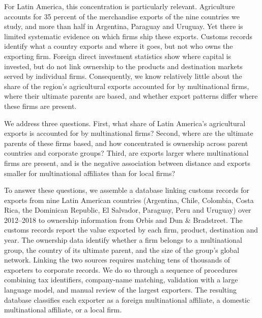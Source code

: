 \documentclass[11pt,a4paper]{article}
\begin{document}
For Latin America, this concentration is particularly relevant. Agriculture accounts for 35 percent
of the merchandise exports of the nine countries we study, and more than half in Argentina, Paraguay
and Uruguay. Yet there is limited systematic evidence on which firms ship these exports. Customs
records identify what a country exports and where it goes, but not who owns the exporting firm.
Foreign direct investment statistics show where capital is invested, but do not link ownership to
the products and destination markets served by individual firms. Consequently, we know relatively
little about the share of the region's agricultural exports accounted for by multinational firms,
where their ultimate parents are based, and whether export patterns differ where these firms are
present.

We address three questions. First, what share of Latin America's agricultural exports is
accounted for by multinational firms? Second, where are the ultimate parents of these firms based,
and how concentrated is ownership across parent countries and corporate groups? Third, are exports
larger where multinational firms are present, and is the negative association between distance and
exports smaller for multinational affiliates than for local firms?

To answer these questions, we assemble a database linking customs records for exports from nine
Latin American countries (Argentina, Chile, Colombia, Costa Rica, the Dominican Republic, El
Salvador, Paraguay, Peru and Uruguay) over 2012--2018 to ownership information from Orbis and Dun
\& Bradstreet. The customs records report the value exported by each firm, product, destination
and year. The ownership data identify whether a firm belongs to a multinational group, the country
of its ultimate parent, and the size of the group's global network. Linking the two sources
requires matching tens of thousands of exporters to corporate records. We do so through a sequence
of procedures combining tax identifiers, company-name matching, validation with a large language
model, and manual review of the largest exporters. The resulting database classifies each exporter
as a foreign multinational affiliate, a domestic multinational affiliate, or a local firm.
\end{document}
